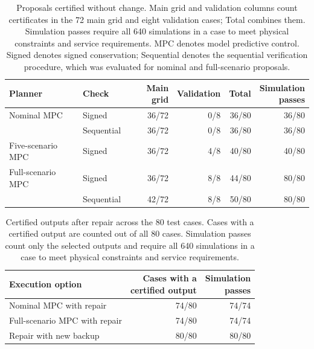 \documentclass[final]{cas-sc}
\theoremstyle{definition}
\theoremstyle{plain}
\theoremstyle{definition}
\theoremstyle{plain}
\begin{document}
\begin{table}[pos=!htb]
\centering\small
\caption{Proposals certified without change. Main grid and validation
columns count certificates in the 72 main grid and eight validation
cases; Total combines them. Simulation passes require all 640
simulations in a case to meet physical constraints and service
requirements. MPC denotes model predictive control. Signed denotes
signed conservation; Sequential denotes the sequential verification
procedure, which was evaluated for nominal and full-scenario proposals.}
\label{tab:benchmark-deadlines}
\label{tab:fixed-portfolio}
\begin{tabularx}{\linewidth}{@{}Xlrrrr@{}}
\toprule
Planner & Check & Main grid & Validation & Total & \shortstack{Simulation\\passes}\\
\midrule
Nominal MPC & Signed & 36/72 & 0/8 & 36/80 & 36/80\\
 & Sequential & 36/72 & 0/8 & 36/80 & 36/80\\
Five-scenario MPC & Signed & 36/72 & 4/8 & 40/80 & 40/80\\
Full-scenario MPC & Signed & 36/72 & 8/8 & 44/80 & 80/80\\
 & Sequential & 42/72 & 8/8 & 50/80 & 80/80\\
\bottomrule
\end{tabularx}
\end{table}

\begin{table}[pos=!htb]
\centering\small
\caption{Certified outputs after repair across the 80 test cases. Cases
with a certified output are counted out of all 80 cases. Simulation
passes count only the selected outputs and require all 640 simulations
in a case to meet physical constraints and service requirements.}
\label{tab:repair-outcomes}
\begin{tabularx}{\linewidth}{@{}Xrr@{}}
\toprule
Execution option & \shortstack{Cases with a\\certified output} &
\shortstack{Simulation\\passes}\\
\midrule
Nominal MPC with repair & 74/80 & 74/74\\
Full-scenario MPC with repair & 74/80 & 74/74\\
Repair with new backup & 80/80 & 80/80\\
\bottomrule
\end{tabularx}
\end{table}
\end{document}
